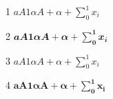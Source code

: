 \documentclass{article}
\begin{document}
1 $aA1αΑ+\alpha + \sum_0^1 x_i$

2 $𝒂𝑨𝟏𝜶𝜜+𝜶 + \sum_𝟎^𝟏 𝒙_𝒊$

3 {\boldmath $aA1αΑ+\alpha + \sum_0^1 x_i$}

4 $\bm{aA1αΑ+\alpha + \sum_0^1 x_i}$
\end{document}
